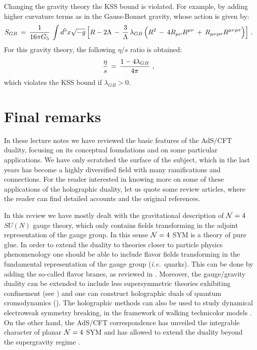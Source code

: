 \documentclass[12pt,notitlepage,a4paper]{article}
\newcommand{\beq}{\begin{equation}}
\newcommand{\eeq}{\end{equation}}
\def\ie{{\emph{i.e.}}}
\begin{document}
Changing the gravity theory the KSS bound is violated. For example, by adding higher curvature terms as in the Gauss-Bonnet gravity, whose action is given by:
\beq
S_{GB}\,=\,{1\over 16\pi G_5}\,\int d^5x \sqrt{-g}\,\Big[
R-2\Lambda\,-\,{3\over \Lambda}\,\lambda_{GB}\,
\Big(R^2\,-\,4R_{\mu\nu}R^{\mu\nu}\,+\,R_{\mu\nu\rho\sigma}
R^{\mu\nu\rho\sigma}\Big)\Big]\,\,.
\eeq
For this gravity theory,  the following $\eta/s$ ratio is obtained:
\beq
{\eta\over s}\,=\,{1-4\lambda_{GB}\over 4\pi}\,\,,
\eeq
which violates the KSS bound if $\lambda_{GB}>0$. 


\section*{Final remarks}

In these lecture notes we have reviewed the basic features of the AdS/CFT duality, focusing on its conceptual foundations and on some particular applications. We have only scratched the surface of the subject, which  in the last years has become a highly diversified field with many ramifications and connections. For the reader interested in knowing more on some of these applications of the holographic duality, let us quote some review articles, where the reader can find detailed accounts and the original references.  

In this review we have mostly dealt with the gravitational description of 
${\cal N}=4$ $SU(N)$ gauge theory, which only contains fields transforming in the adjoint representation of the gauge group. In this sense ${\cal N}=4$ SYM is a theory of pure glue. In order to extend the duality to theories closer to particle physics phenomenology one should be able to include flavor fields transforming in the fundamental representation of the gauge group (\ie\ quarks). This can be done by adding the so-called flavor branes, as reviewed  in \cite{CasalderreySolana:2011us,Erdmenger:2007cm}.  Moreover, the gauge/gravity duality can be extended to include less supersymmetric theories exhibiting confinement (see \cite{Edelstein:2006kw}) and one can construct holographic duals of quantum cromodynamics (\cite{CasalderreySolana:2011us,Kim:2012ey,Peeters:2007ab,Mateos:2007ay}). The holographic methods can also be used to study dynamical electroweak symmetry breaking, in the framework of walking technicolor models \cite{Piai:2010ma}. On the other hand, the AdS/CFT correspondence has unveiled the integrable character of planar ${\cal N}=4$ SYM and has allowed to extend the duality beyond the supergravity regime \cite{Beisert:2010jr}. 
\end{document}
